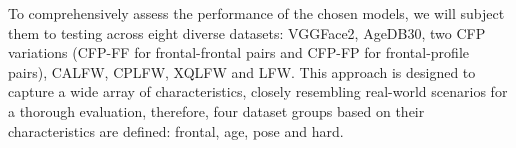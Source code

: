 \documentclass[class=report, crop=false, a4paper, 12pt]{standalone}
\begin{document}
\par To comprehensively assess the performance of the chosen models, we will subject them to testing across eight diverse datasets: VGGFace2, AgeDB30, two CFP variations (CFP-FF for frontal-frontal pairs and CFP-FP for frontal-profile pairs), CALFW, CPLFW, XQLFW and LFW. This approach is designed to capture a wide array of characteristics, closely resembling real-world scenarios for a thorough evaluation, therefore, four dataset groups based on their characteristics are defined: frontal, age, pose and hard. 


\end{document}
